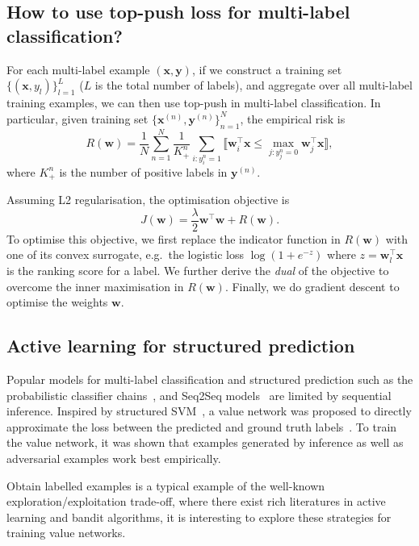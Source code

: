\documentclass[9pt]{extarticle}
\newcommand{\llb}{\llbracket}
\newcommand{\rrb}{\rrbracket}
\newcommand{\x}{\mathbf{x}}
\newcommand{\y}{\mathbf{y}}
\newcommand{\1}{\mathbf{1}}
\newcommand{\w}{\mathbf{w}}
\newcommand{\pb}[1]{^{({#1})}}
\newcommand{\eg}{e.g.\ }
\begin{document}
\subsection*{How to use top-push loss for multi-label classification?}

For each multi-label example $(\x, \y)$, if we construct a training set $\{(\x, y_l)\}_{l=1}^L$ ($L$ is the total number of labels),
and aggregate over all multi-label training examples, we can then use top-push in multi-label classification. 
In particular, given training set $\{\x\pb{n}, \y\pb{n}\}_{n=1}^N$, the empirical risk is
\begin{equation*}
R(\w) = \frac{1}{N} \sum_{n=1}^N \frac{1}{K_+^n} \sum_{i:y_i^n=1} \llb \w_i^\top \x \le \underset{j:y_j^n=0}{\max} \w_j^\top \x \rrb,
\end{equation*}
where $K_+^n$ is the number of positive labels in $\y\pb{n}$.

Assuming L2 regularisation, the optimisation objective is
\begin{equation*}
J(\w) = \frac{\lambda}{2}\w^\top \w + R(\w).
\end{equation*}
To optimise this objective, we first replace the indicator function in $R(\w)$ with one of its convex surrogate, 
\eg the logistic loss $\log(1+e^{-z})$ where $z = \w_l^\top \x$ is the ranking score for a label.
We further derive the \emph{dual} of the objective to overcome the inner maximisation in $R(\w)$.
Finally, we do gradient descent to optimise the weights $\w$.


\subsection*{Active learning for structured prediction}

Popular models for multi-label classification and structured prediction such as the probabilistic classifier chains~\cite{dembczynski:2010},
and Seq2Seq models~\cite{Vinyals:2017} are limited by sequential inference. 
Inspired by structured SVM~\cite{taskar2004max,tsochantaridis2004support}, 
a value network was proposed to directly approximate the loss between the predicted and ground truth labels~\cite{gygli17a}.
To train the value network, it was shown that examples generated by inference as well as adversarial examples work best empirically. 

Obtain labelled examples is a typical example of the well-known exploration/exploitation trade-off, where there exist rich literatures in active learning and bandit algorithms, it is interesting to explore these strategies for training value networks.
\end{document}

